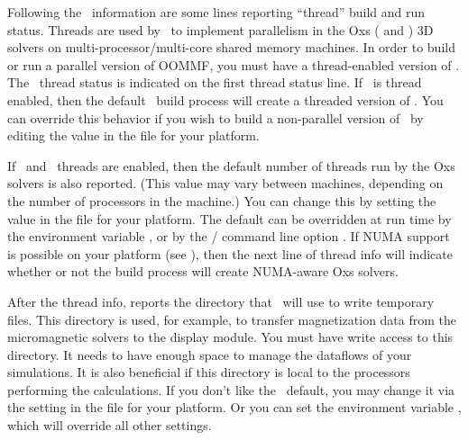 Following the \Tk\ information are some lines reporting ``thread'' build
and run status. Threads are used by \OOMMF\ to implement parallelism in
the Oxs ( and ) 3D solvers on
multi-processor/multi-core shared memory machines.  In order to build or
run a parallel version of OOMMF, you must have a thread-enabled version
of \Tcl.  The \Tcl\ thread status is indicated on the first thread
status line.  If \Tcl\ is thread enabled, then the default \OOMMF\ build
process will create a threaded version of \OOMMF.  You can override this
behavior if you wish to build a non-parallel version of \OOMMF\ by
editing the
 value in
the  file for your platform.

If \Tcl\ and \OOMMF\ threads are enabled, then 
the default number of threads run by the Oxs solvers is also
reported.  (This value may
vary between machines, depending on the number of processors in the
machine.)  You can change this by setting the
 value in
the  file for your platform.  The default can be
overridden at run time by the environment variable
, or by
the / command line option .  If
NUMA support is possible on your platform (see
),
then the next line of thread info will indicate whether or not the build
process will create NUMA-aware Oxs solvers.

After the thread info,  reports the directory
that \OOMMF\ will use to write temporary files.
This directory is used, for example, to transfer magnetization data from
the micromagnetic solvers to the  display module.  You must
have write access to this directory.  It needs to have enough space to
manage the dataflows of your simulations.  It is also beneficial if
this directory is local to the processors performing the calculations.
If you don't like the \OOMMF\ default, you may change it via the
setting in the  file for your platform.  Or you
can set the environment variable
, which will
override all other settings.

